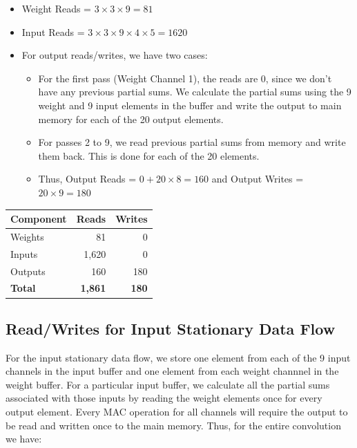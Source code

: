 \documentclass{article}
\begin{document}
\begin{itemize}
    \item Weight Reads = $3 \times 3 \times 9 = 81$
    \item Input Reads = $3 \times 3 \times 9 \times 4 \times 5 = 1620$
    \item For output reads/writes, we have two cases:
        \begin{itemize}
            \item For the first pass (Weight Channel 1), the reads are 0, since we don't have any previous partial sums. 
            We calculate the partial sums using the 9 weight and 9 input elements in the buffer and write the output to main memory for each of the 20 output elements.
            \item For passes 2 to 9, we read previous partial sums from memory and write them back. This is done for each of the 20 elements.
            \item Thus, Output Reads = $0 + 20 \times 8 = 160$ and Output Writes = $20 \times 9 = 180$
        \end{itemize}
\end{itemize}

\begin{table}[h]
\centering
    \begin{tabular}{|l|r|r|}
    \hline
    \textbf{Component} & \textbf{Reads} & \textbf{Writes} \\ \hline
    Weights            & 81             & 0               \\ \hline
    Inputs             & 1,620          & 0               \\ \hline
    Outputs            & 160            & 180             \\ \hline
    \textbf{Total}     & \textbf{1,861} & \textbf{180}    \\ \hline
    \end{tabular}
\end{table}

\subsection{Read/Writes for Input Stationary Data Flow}

For the input stationary data flow, we store one element from each of the 9 input channels in the input buffer and one element from each weight channnel in the weight buffer.
For a particular input buffer, we calculate all the partial sums associated with those inputs by reading the weight elements once for every output element.
Every MAC operation for all channels will require the output to be read and written once to the main memory. Thus, for the entire convolution we have:
\end{document}
